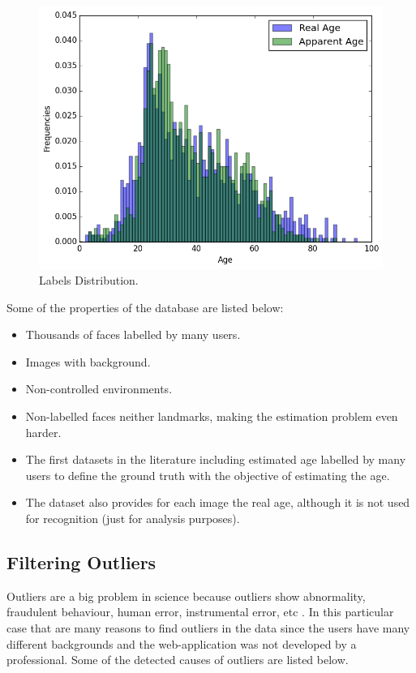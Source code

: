 \begin{figure}[h!]
	\centering
	\includegraphics[width=\textwidth]{figures/Label_Distribution}
	\caption{Labels Distribution.}
	\label{fig:distr}
\end{figure}

Some of the properties of the database are listed below:

\begin{itemize}
	\item Thousands of faces labelled by many users.
	\item Images with background.
	\item Non-controlled environments.
	\item Non-labelled faces neither landmarks, making the estimation problem even harder.
	\item The first datasets in the literature including
	estimated age labelled by many users to define the ground truth with the objective of estimating the age.
	\item The dataset also provides for each image the real age, although it is not used for recognition (just for analysis purposes).
\end{itemize}

\subsection{Filtering Outliers}

Outliers are a big problem in science because outliers show abnormality, fraudulent behaviour, human error, instrumental error, etc \cite{Hodge:2004:SOD:1028911.1028946}. In this particular case that are many reasons to find outliers in the data since the users have many different backgrounds and the web-application was not developed by a professional. Some of the detected causes of outliers are listed below.

